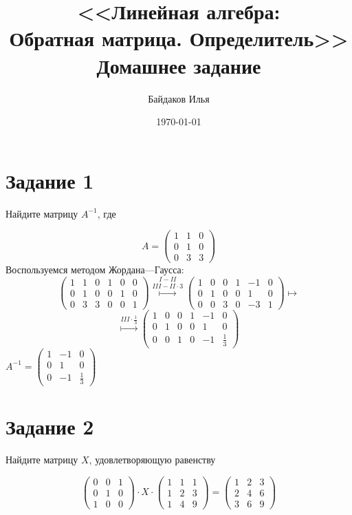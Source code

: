 \documentclass[a4paper,12pt]{article}
\begin{document}
\title{<<Линейная алгебра:\\ Обратная матрица. Определитель>>\\ \vspace{12pt} Домашнее задание}
\author{Байдаков Илья}
\date{\today}
\maketitle

\section*{Задание 1}
Найдите матрицу $A^{-1}$, где

$$
A=\begin{pmatrix}
1&1&0\\
0&1&0\\
0&3&3
\end{pmatrix}
$$
 Воспользуемся методом Жордана—Гаусса:
$$ 
\left(
\begin{array}{ccc|ccc}
1&1&0&1&0&0\\
0&1&0&0&1&0\\
0&3&3&0&0&1
\end{array}
\right)
\overset{I - II}{\overset{III - II \cdot 3}{\longmapsto}}
\left(
\begin{array}{ccc|ccc}
1&0&0&1&-1&0\\
0&1&0&0&1&0\\
0&0&3&0&-3&1
\end{array}
\right)
\longmapsto
$$
$$ 
\overset{III \cdot \frac{1}{3}}{\longmapsto}
\left(
\begin{array}{ccc|ccc}
1&0&0&1&-1&0\\
0&1&0&0&1&0\\
0&0&1&0&-1&\frac{1}{3}
\end{array}
\right)
$$
$A^{-1}= 
\begin{pmatrix}
1&-1&0\\
0&1&0\\
0&-1&\frac{1}{3}
\end{pmatrix}
$
\newpage
\section*{Задание 2}
Найдите матрицу $X$, удовлетворяющую равенству

$$
\begin{pmatrix}
0&0&1\\
0&1&0\\
1&0&0
\end{pmatrix}
\cdot
X
\cdot
\begin{pmatrix}
1&1&1\\
1&2&3\\
1&4&9
\end{pmatrix}
=
\begin{pmatrix}
1&2&3\\
2&4&6\\
3&6&9
\end{pmatrix}
$$
\end{document}
